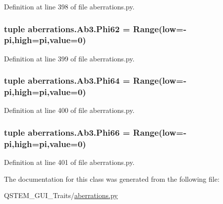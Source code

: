 Definition at line 398 of file aberrations.\-py.

\hypertarget{classaberrations_1_1_ab3_a72bff7546fac1a0b8855aa21b007e6ab}{
\subsubsection[{Phi62}]{\setlength{\rightskip}{0pt plus 5cm}tuple aberrations.\-Ab3.\-Phi62 = Range(low=-\/pi,high=pi,{\bf value}=0)\hspace{0.3cm}{\ttfamily [static]}}}\label{classaberrations_1_1_ab3_a72bff7546fac1a0b8855aa21b007e6ab}


Definition at line 399 of file aberrations.\-py.

\hypertarget{classaberrations_1_1_ab3_ae8134a4d98473fde855a519ec2e24289}{
\subsubsection[{Phi64}]{\setlength{\rightskip}{0pt plus 5cm}tuple aberrations.\-Ab3.\-Phi64 = Range(low=-\/pi,high=pi,{\bf value}=0)\hspace{0.3cm}{\ttfamily [static]}}}\label{classaberrations_1_1_ab3_ae8134a4d98473fde855a519ec2e24289}


Definition at line 400 of file aberrations.\-py.

\hypertarget{classaberrations_1_1_ab3_ac572bbd6cfdf9dc00c3325936cfcb7dd}{
\subsubsection[{Phi66}]{\setlength{\rightskip}{0pt plus 5cm}tuple aberrations.\-Ab3.\-Phi66 = Range(low=-\/pi,high=pi,{\bf value}=0)\hspace{0.3cm}{\ttfamily [static]}}}\label{classaberrations_1_1_ab3_ac572bbd6cfdf9dc00c3325936cfcb7dd}


Definition at line 401 of file aberrations.\-py.



The documentation for this class was generated from the following file\-:\begin{DoxyCompactItemize}
\item 
Q\-S\-T\-E\-M\-\_\-\-G\-U\-I\-\_\-\-Traits/\hyperlink{aberrations_8py}{aberrations.\-py}\end{DoxyCompactItemize}
